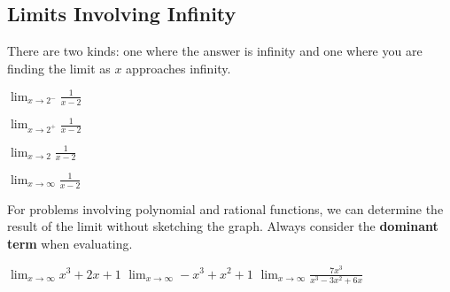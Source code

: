 \subsection*{Limits Involving Infinity}
There are two kinds: one where the answer is infinity and one where you are finding the limit as $x$ approaches infinity.
\begin{questions}
    \begin{minipage}{0.45\linewidth}
    \question $\displaystyle\lim_{x\to2^-}\frac{1}{x-2}$
    \end{minipage}
    \hfill
    \begin{minipage}{0.45\linewidth}
    \question $\displaystyle\lim_{x\to2^+}\frac{1}{x-2}$
    \end{minipage}
    
    
    \begin{minipage}{0.45\linewidth}
    \question $\displaystyle\lim_{x\to2}\frac{1}{x-2}$
    \end{minipage}
    \hfill
    \begin{minipage}{0.45\linewidth}
    \question $\displaystyle\lim_{x\to\infty}\frac{1}{x-2}$
    \end{minipage}
    
\end{questions}
For problems involving polynomial and rational functions, we can determine the result of the limit without sketching the graph. Always consider the \textbf{dominant term} when evaluating.

\begin{questions}
    \question $\displaystyle\lim_{x\to\infty}x^3+2x+1$
    \question $\displaystyle\lim_{x\to\infty}-x^3+x^2+1$
    \question $\displaystyle\lim_{x\to\infty}\frac{7x^3}{x^3-3x^2+6x}$
\end{questions}

\newpage

